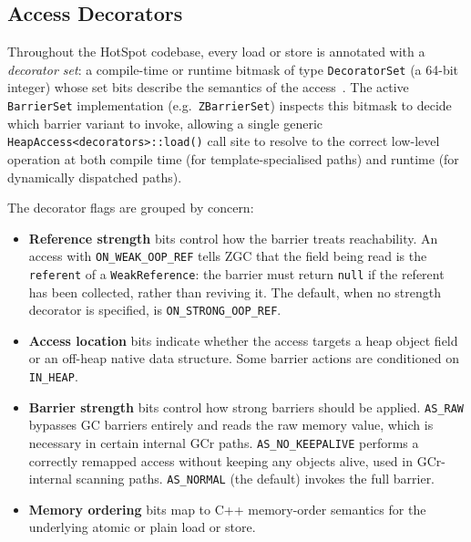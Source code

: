 \subsection{Access Decorators}
\label{subsec:bg-zgc-decorators}

Throughout the HotSpot codebase, every load or store is annotated with a \emph{decorator set}: a compile-time or runtime bitmask of type \texttt{DecoratorSet} (a 64-bit integer) whose set bits describe the semantics of the access~\cite{openjdk-accessdecorators-hpp}. The active \texttt{BarrierSet} implementation (e.g.\ \texttt{ZBarrierSet}) inspects this bitmask to decide which barrier variant to invoke, allowing a single generic \texttt{HeapAccess<decorators>::load()} call site to resolve to the correct low-level operation at both compile time (for template-specialised paths) and runtime (for dynamically dispatched paths).

The decorator flags are grouped by concern:

\begin{itemize}
    \item \textbf{Reference strength} bits control how the barrier treats reachability. An access with \texttt{ON\_WEAK\_OOP\_REF} tells \ac{ZGC} that the field being read is the \texttt{referent} of a \texttt{WeakReference}: the barrier must return \texttt{null} if the referent has been collected, rather than reviving it. The default, when no strength decorator is specified, is \texttt{ON\_STRONG\_OOP\_REF}.

    \item \textbf{Access location} bits indicate whether the access targets a heap object field or an off-heap native data structure. Some barrier actions are conditioned on \texttt{IN\_HEAP}.

    \item \textbf{Barrier strength} bits control how strong barriers should be applied. \texttt{AS\_RAW} bypasses \ac{GC} barriers entirely and reads the raw memory value, which is necessary in certain internal \ac{GCr} paths. \texttt{AS\_NO\_KEEPALIVE} performs a correctly remapped access without keeping any objects alive, used in \ac{GCr}-internal scanning paths. \texttt{AS\_NORMAL} (the default) invokes the full barrier.

    \item \textbf{Memory ordering} bits map to C++ memory-order semantics for the underlying atomic or plain load or store.
\end{itemize}

